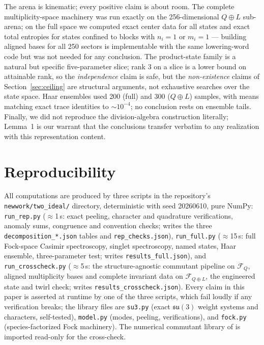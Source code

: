 \documentclass[11pt]{article}
\newcommand{\Fock}{\mathcal{F}}
\newcommand{\su}[1]{\mathfrak{su}(#1)}
\begin{document}
The arena is kinematic; every positive claim is about room. The complete multiplicity-space machinery was run exactly on the 256-dimensional $Q\oplus L$ sub-arena; on the full space we computed exact center data for all states and exact total entropies for states confined to blocks with $n_i = 1$ or $m_i = 1$ --- building aligned bases for all 250 sectors is implementable with the same lowering-word code but was not needed for any conclusion. The product-state family is a natural but specific five-parameter slice; rank 3 on a slice is a lower bound on attainable rank, so the \emph{independence} claim is safe, but the \emph{non-existence} claims of Section~\ref{sec:ceiling} are structural arguments, not exhaustive searches over the state space. Haar ensembles used 200 (full) and 300 ($Q\oplus L$) samples, with means matching exact trace identities to $\sim 10^{-4}$; no conclusion rests on ensemble tails. Finally, we did not reproduce the division-algebra construction literally; Lemma~1 is our warrant that the conclusions transfer verbatim to any realization with this representation content.

\section{Reproducibility}\label{sec:repro}

{\sloppy All computations are produced by three scripts in the repository's \texttt{newwork/two\_ideal/} directory, deterministic with seed 20260610, pure NumPy: \texttt{run\_rep.py} ($\approx$1\,s: exact peeling, character and quadrature verifications, anomaly sums, congruence and convention checks; writes the three \texttt{decomposition\_*.json} tables and \texttt{rep\_checks.json}), \texttt{run\_full.py} ($\approx$15\,s: full Fock-space Casimir spectroscopy, singlet spectroscopy, named states, Haar ensemble, three-parameter test; writes \texttt{results\_full.json}), and \texttt{run\_crosscheck.py} ($\approx$5\,s: the structure-agnostic commutant pipeline on $\Fock_Q$, aligned multiplicity bases and complete invariant data on $\Fock_{Q\oplus L}$, the engineered state and twirl check; writes \texttt{results\_crosscheck.json}). Every claim in this paper is asserted at runtime by one of the three scripts, which fail loudly if any verification breaks; the library files are \texttt{su3.py} (exact $\su3$ weight systems and characters, self-tested), \texttt{model.py} (modes, peeling, verifications), and \texttt{fock.py} (species-factorized Fock machinery). The numerical commutant library of \cite{p2} is imported read-only for the cross-check.\par}
\end{document}
